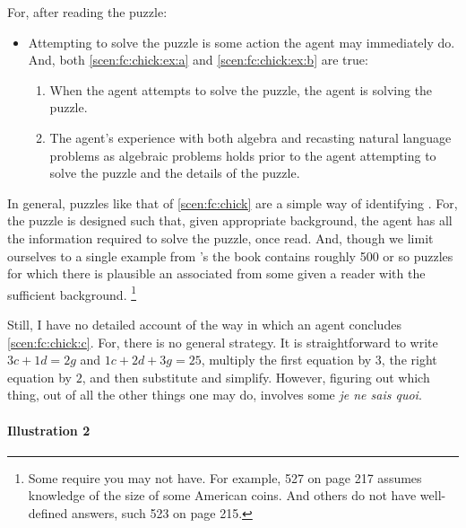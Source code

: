 \begin{note}
  For, after reading the puzzle:
  \begin{itemize}
  \item
    Attempting to solve the puzzle is some action the agent may immediately do.
    And, both \ref{scen:fc:chick:ex:a} and \ref{scen:fc:chick:ex:b} are true:
    \begin{enumerate}[label=\alph*., ref=(\alph*)]
    \item
      \label{scen:fc:chick:ex:a}
      When the agent attempts to solve the puzzle, the agent is solving the puzzle.
    \item
      \label{scen:fc:chick:ex:b}
      The agent's experience with both algebra and recasting natural language problems as algebraic problems holds prior to the agent attempting to solve the puzzle and the details of the puzzle.
    \end{enumerate}
  \end{itemize}
  In general, puzzles like that of \autoref{scen:fc:chick} are a simple way of identifying .
  For, the puzzle is designed such that, given appropriate background, the agent has all the information required to solve the puzzle, once read.
  And, though we limit ourselves to a single example from \citeauthor{Dudeney:1995aa}'s  the book contains roughly 500 or so puzzles for which there is plausible an associated  from some \pool{} given a reader with the sufficient background.%
  \footnote{
    Some require \evals{} you may not have.
    For example, 527 on page 217 assumes knowledge of the size of some American coins.
    And others do not have well-defined answers, such 523 on page 215.
  }

  Still, I have no detailed account of the way in which an agent concludes \ref{scen:fc:chick:c}.
  For, there is no general strategy.
  It is straightforward to write \(3c + 1d = 2g\) and \(1c + 2d + 3g = 25\), multiply the first equation by \(3\), the right equation by \(2\), and then substitute and simplify.
  However, figuring out which thing, out of all the other things one may do, involves some \emph{je ne sais quoi}.
\end{note}

\paragraph{Illustration 2}

